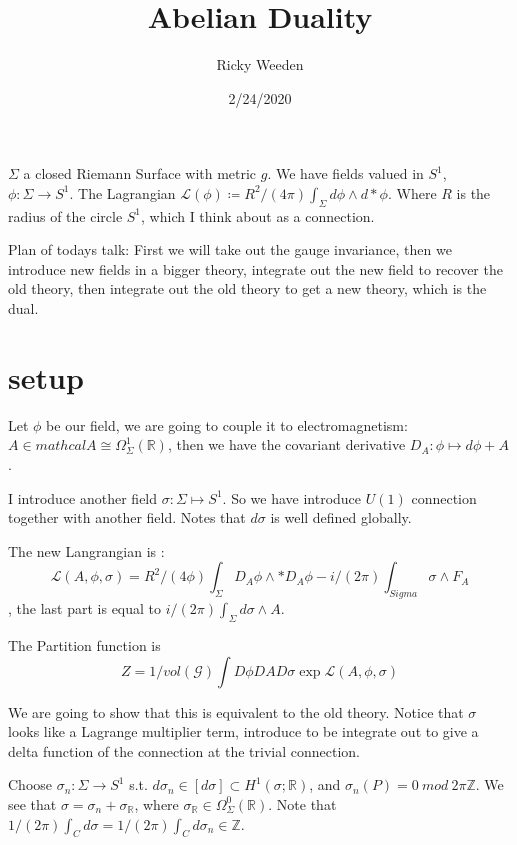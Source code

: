 \documentclass[../main.tex]{subfiles}
\title{Abelian Duality}
\author{Ricky Weeden}
\date{2/24/2020}
\begin{document}
\maketitle
\tableofcontents


\noindent $\Sigma$ a closed Riemann Surface with metric $g$. We have fields valued in $S^1$, $\phi: \Sigma \rightarrow S^1$. The Lagrangian $\mathcal{L}(\phi) \coloneqq R^2/(4\pi) \int_{\Sigma} d\phi \wedge d*\phi$. Where $R$ is the radius of the circle $S^1$, which I think about as a connection.

Plan of todays talk: First we will take out the gauge invariance, then we introduce new fields in a bigger theory, integrate out the new field to recover the old theory, then integrate out the old theory to get a new theory, which is the dual.

\section{setup}

Let $\phi$ be our field, we are going to couple it to electromagnetism: $A \in mathcal{A} \cong \Omega^1_{\Sigma}(\mathbb{R})$, then we have the covariant derivative $D_A : \phi \mapsto d\phi + A$.

I introduce another field $\sigma: \Sigma \mapsto S^1$. So we have introduce $U(1)$ connection together with another field. Notes that $d\sigma$ is well defined globally.

The new Langrangian is :
$$\mathcal{L}(A, \phi, \sigma) = R^2/(4\phi) \int_{\Sigma}D_A\phi \wedge *D_A\phi - i/(2\pi) \int_{Sigma} \sigma \wedge F_A$$, the last part is equal to $i/(2\pi) \int_{\Sigma} d\sigma \wedge A$.

The Partition function is $$Z = 1/vol({\mathcal{G}}) \int D\phi DA D\sigma \exp{\mathcal{L}(A, \phi, \sigma)}$$


We are going to show that this is equivalent to the old theory. Notice that $\sigma$ looks like a Lagrange multiplier term, introduce to be integrate out to give a delta function of the connection at the trivial connection.


Choose $\sigma_n:\Sigma \rightarrow S^1$ s.t. $d\sigma_n \in [d\sigma] \subset H^1(\sigma;\mathbb{R})$, and $\sigma_n(P) = 0 \ mod \ 2\pi\mathbb{Z}$. We see that $\sigma = \sigma_n + \sigma_{\mathbb{R}}$, where $\sigma_{\mathbb{R}} \in \Omega^0_{\Sigma}(\mathbb{R})$. Note that $1/(2\pi) \int_C d\sigma = 1/(2\pi) \int_C d\sigma_n \in \mathbb{Z}$.
\end{document}
